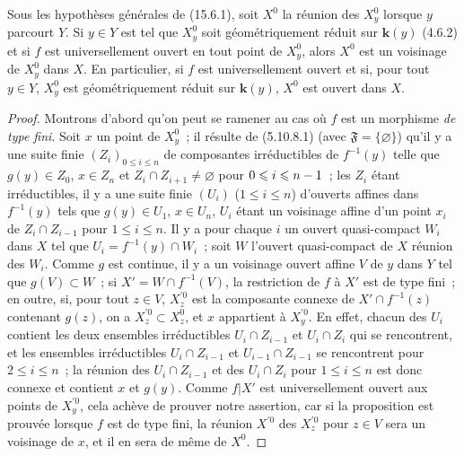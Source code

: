 \begin{proposition}[15.6.4]
\label{IV.15.6.4-fr}
Sous les hypothèses générales de \textup{(15.6.1)}, soit $X^0$ la réunion des $X_y^0$ lorsque $y$ parcourt $Y$. Si $y\in Y$ est tel que $X_y^0$ soit géométriquement réduit sur $\boldsymbol{k}(y)$ \textup{(4.6.2)} et si $f$ est universellement ouvert en tout point de $X_y^0$, alors $X^0$ est un voisinage de $X_y^0$ dans $X$. En particulier, si $f$ est universellement ouvert et si, pour tout $y\in Y$, $X_y^0$ est géométriquement réduit sur $\boldsymbol{k}(y)$, $X^0$ est ouvert dans $X$.
\end{proposition}

\begin{proof}
Montrons d'abord qu'on peut se ramener au cas où $f$ est un morphisme \emph{de type fini}. Soit $x$ un point de $X_y^0$~; il résulte de (5.10.8.1) (avec $\mathfrak F=\{\varnothing\}$) qu'il y a une suite finie $(Z_i)_{0\leqslant i\leqslant n}$ de composantes irréductibles de $f^{-1}(y)$ telle que $g(y)\in Z_0$, $x\in Z_n$ et $Z_i\cap Z_{i+1}\ne\varnothing$ pour $0\leqslant i\leqslant n- 1$~; les $Z_i$ étant irréductibles, il y a une suite finie $(U_i)$ ($1\leqslant i\leqslant n$) d'ouverts affines dans $f^{-1}(y)$ tels que $g(y)\in U_1$, $x\in U_n$, $U_i$ étant un voisinage affine d'un point $x_i$ de $Z_i\cap Z_{i-1}$ pour $1\leqslant i\leqslant n$. Il y a pour chaque $i$ un ouvert quasi-compact $W_i$ dans $X$ tel que $U_i=f^{-1}(y)\cap W_i$~; soit $W$ l'ouvert quasi-compact de $X$ réunion des $W_i$. Comme $g$ est continue, il y a un voisinage ouvert affine $V$ de $y$ dans $Y$ tel que $g(V)\subset W$~; si $X'=W\cap f^{-1}(V)$, la restriction de $f$ à $X'$ est de type fini~; en outre, si, pour tout $z\in V$, $X_z^{\prime 0}$ est la composante connexe de $X'\cap f^{-1}(z)$ contenant $g(z)$, on a $X_z^{\prime 0}\subset X_z^0$, et $x$ appartient à $X_y^{\prime 0}$. En effet, chacun des $U_i$ contient les deux ensembles irréductibles $U_i\cap Z_{i-1}$ et $U_i\cap Z_i$ qui se rencontrent, et les ensembles irréductibles $U_i\cap Z_{i-1}$ et $U_{i-1}\cap Z_{i-1}$
se rencontrent pour $2\leqslant i\leqslant n$~; la réunion des $U_i\cap Z_{i-1}$ et des $U_i\cap Z_i$ pour $1\leqslant i\leqslant n$ est donc connexe et contient $x$ et $g(y)$. Comme $f|X'$ est universellement ouvert aux points de $X_y^{\prime 0}$, cela achève de prouver notre assertion, car si la proposition est prouvée lorsque $f$ est de type fini, la réunion $X^{\prime 0}$ des $X_z^{\prime 0}$ pour $z\in V$ sera un voisinage de $x$, et il en sera de même de $X^0$.


\end{proof}
